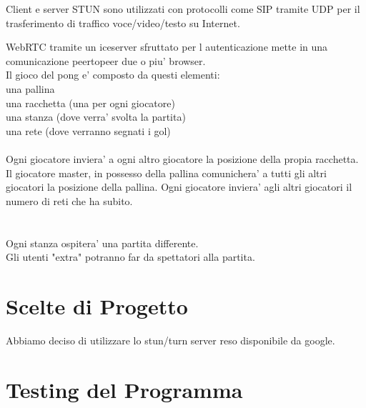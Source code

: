 ﻿\documentclass[11pt, a4paper, titlepage, block]{article}
\begin{document}
Client e server STUN sono utilizzati con protocolli come SIP tramite UDP per il trasferimento di traffico voce/video/testo su Internet.

WebRTC tramite un iceserver sfruttato per l autenticazione mette in una comunicazione peertopeer due o piu' browser.\\
Il gioco del pong e' composto da questi elementi:\\
una pallina\\
una racchetta (una per ogni giocatore)\\
una stanza (dove verra' svolta la partita)\\
una rete (dove verranno segnati i gol)\\
\\
Ogni giocatore inviera' a ogni altro giocatore la posizione della propia racchetta.\\
Il giocatore master, in possesso della pallina comunichera' a tutti gli altri giocatori la posizione della pallina.
Ogni giocatore inviera' agli altri giocatori il numero di reti che ha subito.\\
\\
\\
Ogni stanza ospitera' una partita differente.\\
Gli utenti "extra" potranno far da spettatori alla partita.\\

\section{Scelte di Progetto}
	Abbiamo deciso di utilizzare lo stun/turn server reso disponibile da google.

\section{Testing del Programma}
\end{document}
